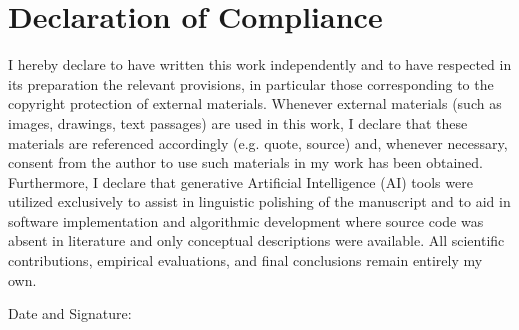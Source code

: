 \section*{Declaration of Compliance }

\vspace{1cm}

I hereby declare to have written this work independently and to have respected in its preparation the relevant provisions, in particular those corresponding to the copyright protection of external materials. Whenever external materials (such as images, drawings, text passages) are used in this work, I declare that these materials are referenced accordingly (e.g. quote, source) and, whenever necessary, consent from the author to use such materials in my work has been obtained. Furthermore, I declare that generative Artificial Intelligence (AI) tools were utilized exclusively to assist in linguistic polishing of the manuscript and to aid in software implementation and algorithmic development where source code was absent in literature and only conceptual descriptions were available. All scientific contributions, empirical evaluations, and final conclusions remain entirely my own.

\vspace{2cm}

Date and Signature:

